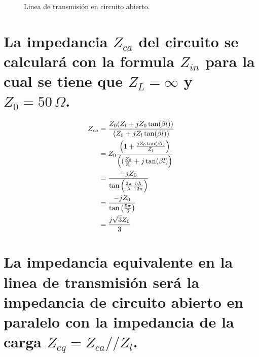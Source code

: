 \documentclass[
  11pt,
  letterpaper,
  answers
]{exam}
\begin{document}
\begin{questions}
\begin{figure}[ht]
    \caption{Linea de transmisión en circuito abierto.}
    \label{fig:lt}
  \end{figure}


\begin{solution}
\begin{parts}
\part{La impedancia $Z_{ca}$ del circuito se calculará con la formula $Z_{in}$ para la cual se tiene que $Z_L = \infty$ y $Z_0 = 50\,\Omega$.}

\begin{align}
  Z_{ca} &=\frac{Z_{0} (Z_{l}+ jZ_{0}\tan(\beta l))}{(Z_{0}+jZ_{l}\tan(\beta l))}\\
  &= Z_{0} \frac{\del{ 1 + \frac{jZ_{0}\tan(\beta l)}{Z_{l}}}}{\del{(\frac{Z_{0}}{Z_{l}} + j\tan(\beta l)}}\\
  &= \frac{-jZ_{0}}{\tan\del{\frac{2\pi}{\lambda} \frac{5\lambda}{12\pi}}}\\
  &= \frac{-jZ_{0}}{\tan\del{\frac{5\pi}{6}}}\\
  &= \frac{j \sqrt{3}Z_{0}}{3}
\end{align}
\part{La impedancia equivalente en la linea de transmisión será la impedancia de circuito abierto en paralelo con la impedancia de la carga $Z_{eq} = Z_{ca}//Z_{l}$.}





\end{parts}
\end{solution}


\end{questions}
\end{document}
